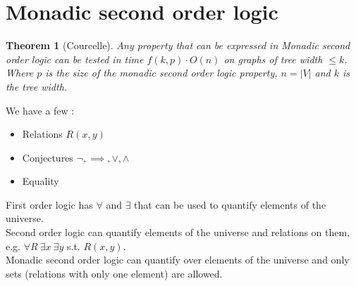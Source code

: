 \documentclass{article}
\newtheorem*{thm}{Theorem}
\theoremstyle{definition}
\begin{document}

\section{Monadic second order logic}

\begin{thm}[Courcelle]
Any property that can be expressed in Monadic second order logic can be tested in time $f(k,p)\cdot O(n)$ on graphs of tree width $\le k$.
Where $p$ is the size of the monadic second order logic property, $n = |V|$ and $k$ is the tree width.
\end{thm}

We have a few :
\begin{itemize}
\item Relations $R(x,y)$
\item Conjectures $\neg,\implies,\vee,\wedge$
\item Equality
\end{itemize}

First order logic has $\forall$ and $\exists$ that can be used to quantify elements of the universe.\\
Second order logic can quantify elements of the universe and relations on them, e.g. $\forall R\ \exists x\ \exists y$ s.t. $R(x,y)$. \\
Monadic second order logic can quantify over elements of the universe and only sets (relations with only one element) are allowed.

\end{document}
